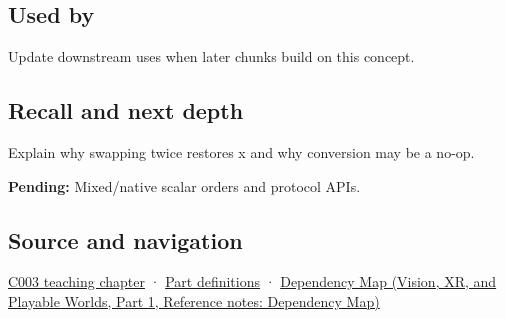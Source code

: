 \subsection{Used by}\label{appendix-11ba36693aa2-used-by}

\hypertarget{appendix-11ba36693aa2-used-by}{}

Update downstream uses when later chunks build on this concept.

\subsection{Recall and next depth}\label{appendix-11ba36693aa2-recall-and-next-depth}

\hypertarget{appendix-11ba36693aa2-recall-and-next-depth}{}

Explain why swapping twice restores x and why conversion may be a no-op.

\textbf{Pending:} Mixed/native scalar orders and protocol APIs.

\subsection{Source and navigation}\label{appendix-11ba36693aa2-source-and-navigation}

\hypertarget{appendix-11ba36693aa2-source-and-navigation}{}

\hyperref[01-foundations-i-ch002-where-the-bytes-live]{C003 teaching chapter} · \hyperref[appendix-fd090d982a15-m003---parts-41-60]{Part definitions} · \href{../07-Vision-XR-and-Playable-Worlds-P01/main.pdf\#appendix-4ad47bdd269a}{Dependency Map (Vision, XR, and Playable Worlds, Part 1, Reference notes: Dependency Map)}
